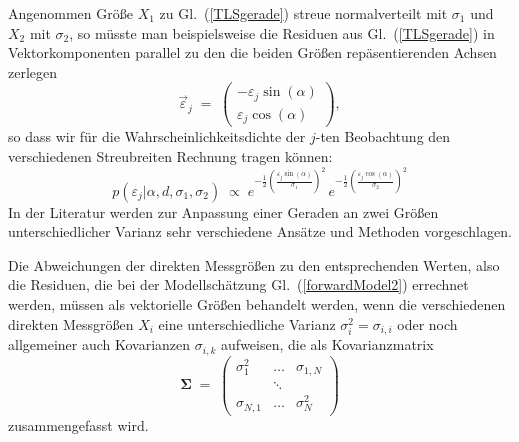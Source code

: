 Angenommen Größe $X_1$ zu Gl.~(\ref{TLSgerade}) streue normalverteilt mit $\sigma_1$ und
$X_2$ mit $\sigma_2$, so müsste man beispielsweise die Residuen aus Gl.~(\ref{TLSgerade}) in
Vektorkomponenten parallel zu den die beiden Größen repäsentierenden Achsen zerlegen
\begin{equation}
\vec \varepsilon_j \; = \;
\left(\begin{array}{c}
-\varepsilon_j \sin(\alpha)\\
\varepsilon_j \cos(\alpha)
\end{array}\right) ,
\end{equation}
so dass wir für die Wahrscheinlichkeitsdichte
der $j$-ten Beobachtung den verschiedenen Streubreiten Rechnung tragen können:
\begin{equation}
p(\varepsilon_j | \alpha, d, \sigma_1, \sigma_2) \; \propto \; 
e^{-\frac{1}{2} \left(\frac{\varepsilon_j \sin(\alpha)}{\sigma_1}\right)^2}
\, e^{-\frac{1}{2} \left(\frac{\varepsilon_j \cos(\alpha)}{\sigma_2}\right)^2}
\end{equation}
In der Literatur werden zur Anpassung einer Geraden an zwei Größen
unterschiedlicher Varianz sehr verschiedene Ansätze und Methoden vorgeschlagen.

Die Abweichungen der direkten Messgrößen zu den entsprechenden Werten, also die Residuen,
die bei der Modellschätzung Gl.~(\ref{forwardModel2}) errechnet werden, müssen als
vektorielle Größen behandelt werden, wenn die verschiedenen direkten Messgrößen $X_i$ eine
unterschiedliche Varianz $\sigma_i^2 = \sigma_{i,i}$ oder noch allgemeiner auch
Kovarianzen $\sigma_{i,k}$ aufweisen, die als Kovarianzmatrix
\begin{equation}
\boldsymbol{\Sigma} \; = \;
\left(\begin{array}{ccc}
\sigma_1^2 & \dots & \sigma_{1,N}\\
 & \ddots & \\
\sigma_{N,1} & \dots & \sigma_N^2
\end{array}\right)
\end{equation}
zusammengefasst wird.

